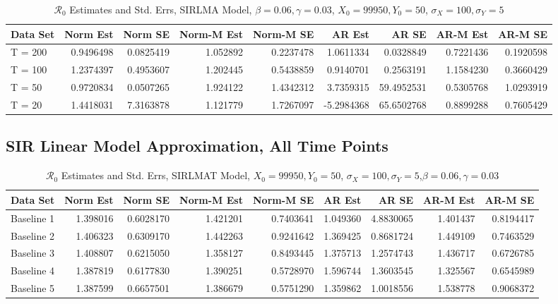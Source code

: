 \documentclass[12pt]{article}
\newcommand{\rr}{\ensuremath{\mathcal{R}_0}}
\begin{document}
\begin{table}[H]
	
	\caption{\label{tab:}$\rr$ Estimates and Std. Errs, SIRLMA Model,
		$\beta = 0.06, \gamma = 0.03$, $X_0 = 99950, Y_0 = 50$, $\sigma_X = 100, \sigma_Y = 5$}
	\centering
	\begin{tabular}[t]{l|r|r|r|r|r|r|r|r}
		\hline
		Data Set & Norm Est & Norm SE & Norm-M Est & Norm-M SE & AR Est & AR SE & AR-M Est & AR-M SE\\
		\hline
		T = 200 & 0.9496498 & 0.0825419 & 1.052892 & 0.2237478 & 1.0611334 & 0.0328849 & 0.7221436 & 0.1920598\\
		\hline
		T = 100 & 1.2374397 & 0.4953607 & 1.202445 & 0.5438859 & 0.9140701 & 0.2563191 & 1.1584230 & 0.3660429\\
		\hline
		T = 50 & 0.9720834 & 0.0507265 & 1.924122 & 1.4342312 & 3.7359315 & 59.4952531 & 0.5305768 & 1.0293919\\
		\hline
		T = 20 & 1.4418031 & 7.3163878 & 1.121779 & 1.7267097 & -5.2984368 & 65.6502768 & 0.8899288 & 0.7605429\\
		\hline
	\end{tabular}
\end{table}

\subsection{SIR Linear Model Approximation, All Time Points}

\begin{table}[H]
	
	\caption{\label{tab:}$\rr$ Estimates and Std. Errs, SIRLMAT Model,
		$X_0 = 99950, Y_0 = 50$, $\sigma_X = 100, \sigma_Y = 5$,$\beta = 0.06, \gamma = 0.03$}
	\centering
	\begin{footnotesize}
		\begin{tabular}[t]{l|r|r|r|r|r|r|r|r}
			\hline
			Data Set & Norm Est & Norm SE & Norm-M Est & Norm-M SE & AR Est & AR SE & AR-M Est & AR-M SE\\
			\hline
			Baseline 1 & 1.398016 & 0.6028170 & 1.421201 & 0.7403641 & 1.049360 & 4.8830065 & 1.401437 & 0.8194417\\
			\hline
			Baseline 2 & 1.406323 & 0.6309170 & 1.442263 & 0.9241642 & 1.369425 & 0.8681724 & 1.449109 & 0.7463529\\
			\hline
			Baseline 3 & 1.408807 & 0.6215050 & 1.358127 & 0.8493445 & 1.375713 & 1.2574743 & 1.436717 & 0.6726785\\
			\hline
			Baseline 4 & 1.387819 & 0.6177830 & 1.390251 & 0.5728970 & 1.596744 & 1.3603545 & 1.325567 & 0.6545989\\
			\hline
			Baseline 5 & 1.387599 & 0.6657501 & 1.386679 & 0.5751290 & 1.359862 & 1.0018556 & 1.538778 & 0.9068372\\
			\hline
		\end{tabular}
	\end{footnotesize}
\end{table}
\end{document}
